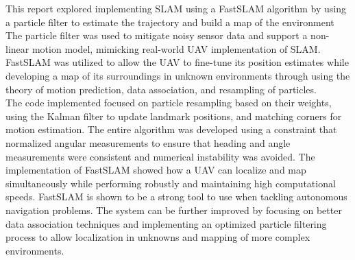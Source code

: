This report explored implementing SLAM using a FastSLAM algorithm by using a particle filter to estimate the trajectory and build a map of the environment The particle filter was used to mitigate noisy sensor data and support a non-linear motion model, mimicking real-world UAV implementation of SLAM. FastSLAM was utilized to allow the UAV to fine-tune its position estimates while developing a map of its surroundings in unknown environments through using the theory of motion prediction, data association, and resampling of particles.\\

The code implemented focused on particle resampling based on their weights, using the Kalman filter to update landmark positions, and matching corners for motion estimation. The entire algorithm was developed using a constraint that normalized angular measurements to ensure that heading and angle measurements were consistent and numerical instability was avoided. The implementation of FastSLAM showed how a UAV can localize and map simultaneously while performing robustly and maintaining high computational speeds. FastSLAM is shown to be a strong tool to use when tackling autonomous navigation problems. The system can be further improved by focusing on better data association techniques and implementing an optimized particle filtering process to allow localization in unknowns and mapping of more complex environments.